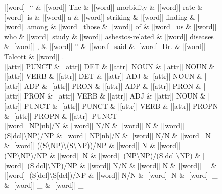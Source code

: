 \documentclass[10pt,a4paper]{article}
\begin{document}
\begin{figure}[h]
{\begin{dependency}[theme = simple]
\begin{deptext}[column sep=1em, row sep=0.1em]
|[word]| {}`{}` \& |[word]| The \& |[word]| morbidity \& |[word]| rate \& |[word]| is \& |[word]| a \& |[word]| striking \& |[word]| finding \& |[word]| among \& |[word]| those \& |[word]| of \& |[word]| us \& |[word]| who \& |[word]| study \& |[word]| asbestos-related \& |[word]| diseases \& |[word]| , \& |[word]| '' \& |[word]| said \& |[word]| Dr. \& |[word]| Talcott \& |[word]| . \\
|[attr]| PUNCT \& |[attr]| DET \& |[attr]| NOUN \& |[attr]| NOUN \& |[attr]| VERB \& |[attr]| DET \& |[attr]| ADJ \& |[attr]| NOUN \& |[attr]| ADP \& |[attr]| PRON \& |[attr]| ADP \& |[attr]| PRON \& |[attr]| PRON \& |[attr]| VERB \& |[attr]| ADJ \& |[attr]| NOUN \& |[attr]| PUNCT \& |[attr]| PUNCT \& |[attr]| VERB \& |[attr]| PROPN \& |[attr]| PROPN \& |[attr]| PUNCT \\
|[word]| NP{[}nb{]}/N \& |[word]| N/N \& |[word]| N \& |[word]| (S{[}dcl{]}\textbackslash{}NP)/NP \& |[word]| NP{[}nb{]}/N \& |[word]| N/N \& |[word]| N \& |[word]| ((S\textbackslash{}NP)\textbackslash{}(S\textbackslash{}NP))/NP \& |[word]| N \& |[word]| (NP\textbackslash{}NP)/NP \& |[word]| N \& |[word]| (NP\textbackslash{}NP)/(S{[}dcl{]}\textbackslash{}NP) \& |[word]| (S{[}dcl{]}\textbackslash{}NP)/NP \& |[word]| N/N \& |[word]| N \& |[word]| \_ \& |[word]| (S{[}dcl{]}\textbackslash{}S{[}dcl{]})/NP \& |[word]| N/N \& |[word]| N \& |[word]| \_ \& |[word]| \_ \& |[word]| \_ \\
\end{deptext}




\end{dependency}}
\end{figure}
\end{document}

